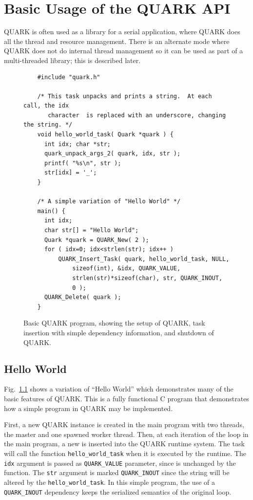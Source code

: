 \documentclass[11pt,letterpaper]{report}
\begin{document}

\chapter{Basic Usage of the QUARK API}

QUARK is often used as a library for a serial application, where QUARK
does all the thread and resource management.  There is an alternate
mode where QUARK does not do internal thread management so it can be
used as part of a multi-threaded library; this is described later.

\begin{figure}[bp]
\centering
\begin{lstlisting}
    #include "quark.h"
    
    /* This task unpacks and prints a string.  At each call, the idx
       character  is replaced with an underscore, changing the string. */
    void hello_world_task( Quark *quark ) {
      int idx; char *str;
      quark_unpack_args_2( quark, idx, str );
      printf( "%s\n", str );
      str[idx] = '_';
    }
    
    /* A simple variation of "Hello World" */
    main() {
      int idx;
      char str[] = "Hello World";
      Quark *quark = QUARK_New( 2 );
      for ( idx=0; idx<strlen(str); idx++ )
          QUARK_Insert_Task( quark, hello_world_task, NULL,
              sizeof(int), &idx, QUARK_VALUE,
              strlen(str)*sizeof(char), str, QUARK_INOUT,
              0 );
      QUARK_Delete( quark );
    }
\end{lstlisting}
\caption{Basic QUARK program, showing the setup of QUARK, task
  insertion with simple dependency information, and shutdown of
  QUARK. }
\label{fig:quark_basic_example}
\end{figure}

\section{Hello World}  
Fig.~\ref{fig:quark_basic_example} shows a
variation of ``Hello World'' which demonstrates many of the basic
features of QUARK.  This is a fully functional C program that
demonstrates how a simple program in QUARK may be implemented.

First, a new QUARK instance is created in the main program with two
threads, the master and one spawned worker thread.  Then, at each
iteration of the loop in the main program, a new is inserted into the
QUARK runtime system.  The task will call the function
\verb|hello_world_task| when it is executed by the runtime.  The
\verb|idx| argument is passed as \verb|QUARK_VALUE| parameter, since is
unchanged by the function.  The \verb|str| argument is marked
\verb|QUARK_INOUT| since the string will be altered by the
\verb|hello_world_task|.  In this simple program, the use of a
\verb|QUARK_INOUT| dependency keeps the serialized semantics of the original
loop.
\end{document}
